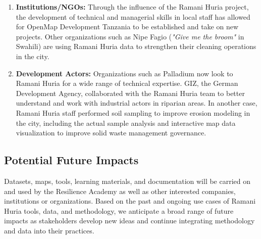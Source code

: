 \documentclass[a4paper,12pt,twoside]{article}
\begin{document}
\begin{mdframed}[hidealllines=true,backgroundcolor=RHgreen!10,innerleftmargin=6pt,innerrightmargin=6pt,leftmargin=-3pt,rightmargin=-3pt]
\begin{enumerate}
\item \textbf{Institutions/NGOs:} Through the influence of the Ramani Huria project, the development of technical and managerial skills in local staff has allowed for OpenMap Development Tanzania to be established and take on new projects. Other organizations such as Nipe Fagio (\textit{"Give me the broom"} in Swahili) are using Ramani Huria data to strengthen their cleaning operations in the city.
\item \textbf{Development Actors:} Organizations such as Palladium now look to Ramani Huria for a wide range of technical expertise. GIZ, the German Development Agency, collaborated with the Ramani Huria team to better understand and work with industrial actors in riparian areas. In another case, Ramani Huria staff performed soil sampling to improve erosion modeling in the city, including the actual sample analysis and interactive map data visualization to improve solid waste management governance.   
\end{enumerate}
\end{mdframed}

\subsection{Potential Future Impacts}
\begin{multicols}{2}
Datasets, maps, tools, learning materials, and documentation will be carried on and used by the Resilience Academy as well as other interested companies, institutions or organizations. Based on the past and ongoing use cases of Ramani Huria tools, data, and methodology, we anticipate a broad range of future impacts as stakeholders develop new ideas and continue integrating methodology and data into their practices. 
\end{multicols}
\end{document}

